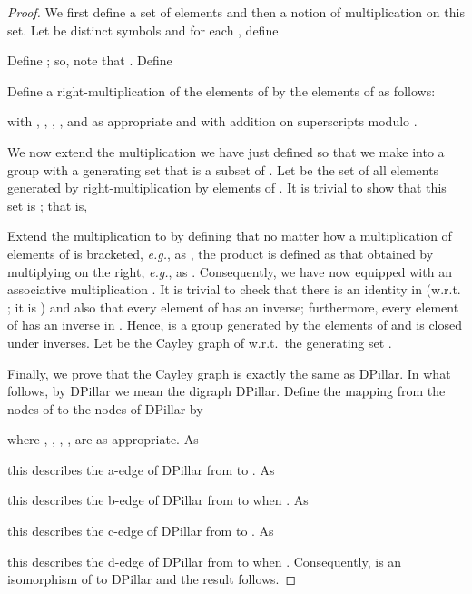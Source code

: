\documentclass{article}
\begin{document}
\begin{proof}
We first define a set of elements and then a notion of multiplication on this set. Let  be distinct symbols and for each , define

Define ; so, note that . Define

Define a right-multiplication  of the elements of  by the elements of  as follows:

with , , , ,  and  as appropriate and with addition on superscripts modulo . 

We now extend the multiplication we have just defined so that we make  into a group with a generating set  that is a subset of . Let  be the set of all elements generated by right-multiplication by elements of . It is trivial to show that this set is ; that is, 

Extend the multiplication  to  by defining that no matter how a
multiplication of elements of  is bracketed, \emph{e.g.}, as , the product is defined as that obtained
by multiplying on the right, \emph{e.g.}, as . Consequently, we have now equipped  with an
associative multiplication . It is trivial to check that there is an
identity in  (w.r.t. ; it is ) and
also that every element of  has an inverse; furthermore, every element of
 has an inverse in . Hence,  is a group generated by the 
elements of  and  is closed
under inverses. Let  be the Cayley graph of  w.r.t.\ the
generating set .

Finally, we prove that the Cayley graph  is exactly the same as DPillar. In what follows, by DPillar we mean the digraph DPillar. Define the mapping  from the nodes of  to the nodes of DPillar by

where , , , ,  are as appropriate. As

this describes the a-edge of DPillar from  to . As

this describes the b-edge of DPillar from  to  when . As

this describes the c-edge of DPillar from  to . As

this describes the d-edge of DPillar from  to  when . Consequently,  is an isomorphism of  to DPillar and the result follows.\end{proof}
\end{document}
